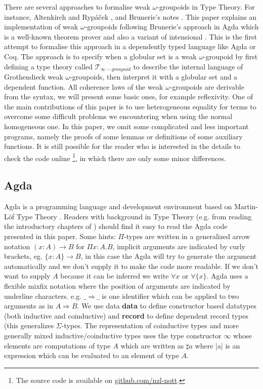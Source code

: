 \documentclass{acm_proc_article-sp}
\newcommand{\wog}{weak $\omega$-groupoids}
\newcommand{\wogs}{weak $\omega$-groupoid} %
\newcommand{\tig}{$\mathcal{T}_{\infty-groupoid}$}
\begin{document}
There are several approaches to formalise {\wog} in Type Theory. For instance, Altenkirch and Ryp\'a\v{c}ek \cite{txa:csl}, and Brunerie's notes \cite{gb:wog}.
This paper explains an implementation of {\wog} following Brunerie's approach in Agda which is a well-known theorem prover and also a variant of intensional {\mltt}. This is the first attempt to formalise this approach in a dependently typed language like Agda or Coq. The approach is to specify when a globular set is a {\wogs} by first defining a type theory called {\tig} to describe the internal language
of Grothendieck {\wog}, then interpret it with a globular set and a dependent function. All coherence laws of the {\wog} are derivable from the syntax, we will present some basic ones, for example reflexivity. One of the main contributions of this paper is to use heterogeneous equality for terms to overcome some difficult problems we encountering when using the normal homogeneous one. In this paper, we omit some complicated and less important programs, namely the proofs of some lemmas or definitions of some auxiliary functions. It is still possible for the reader who is interested in the details to check the code online \footnote{The source code is available on \url{github.com/nzl-nott}.}, in which there are only some minor differences.

\subsection{Agda}

Agda is a programming language and development environment based on
Martin-Löf Type Theory \cite{agda-wiki}. Readers with background in
Type Theory (e.g. from reading the introductory chapters of
\cite{hott-book}) should find it easy to read the Agda code presented
in this paper. Some hints: $\Pi$-types are written in a generalized
arrow notation $(x : A) → B$ for $\Pi x:A.B$, implicit arguments are
indicated by curly brackets, eg. $\{x : A\} → B$, in this case the Agda
will try to generate the argument automatically and we don't supply it
to make the code more readable. If we don't want to supply $A$ because
it can be inferred we write $\forall x$ or $\forall\{x\}$.
Agda uses a flexible mixfix notation
where the position of arguments are indicated by underline characters.
e.g. $\_⇒\_$ is one identifier which can be applied to two arguments as
in $A ⇒ B$.  
We use data \textbf{data} to define constructor based datatypes (both
inductive and coinductive) and \textbf{record} to define dependent record
types (this generalizes $\Sigma$-types. The representation of
coinductive types and more generally mixed inductive/coinductive types
\cite{txa:mpc2010g}
uses the type constructor $\infty$ whose elements are computations of type
$A$ which are written as $\sharp a$ where |a| is an expression which can be
evaluated to an element of type $A$.
\end{document}
